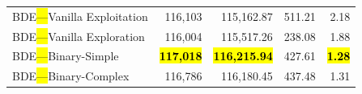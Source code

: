 \documentclass[mathematics,article,accept,moreauthors]{Definitions/mdpi}
\begin{document}
\begin{table}[H]
\begin{tabularx}{\textwidth}{lRRRR}
    \midrule
    BDE\hl{---}Vanilla Exploitation  &         116,103 &        115,162.87 & 511.21 &         2.18 \\
    BDE\hl{---}Vanilla Exploration   &         116,004 &        115,517.26 & 238.08 &         1.88 \\
    BDE\hl{---}Binary-Simple         & \textbf{\hl{117,018}} & \textbf{\hl{116,215.94}} & 427.61 & \textbf{\hl{1.28}} \\
    BDE\hl{---}Binary-Complex        &         116,786 &        116,180.45 & 437.48 &         1.31 \\
    \bottomrule
  \end{tabularx}
\end{table}

\vspace{-9pt}

\end{document}
